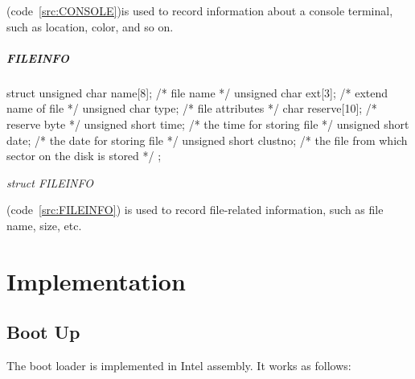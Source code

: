 \documentclass{swfcthesis}
\begin{document}
(code~\ref{src:CONSOLE})is used to record information about a console terminal, such as location,
color, and so on.




\paragraph{FILEINFO}

\begin{listing}[H]
  \begin{codeblock}
\begin{ccode}
struct
{ 
  unsigned char name[8];   /* file name */
  unsigned char ext[3];    /* extend name of file */
  unsigned char type;      /* file attributes */
  char reserve[10];        /* reserve byte */
  unsigned short time;     /* the time for storing file */
  unsigned short date;     /* the date for storing file */
  unsigned short  clustno; /* the file from which sector on the disk is stored */
};
\end{ccode}
  \end{codeblock}
  \caption{\emph{struct FILEINFO}}\label{src:FILEINFO}
\end{listing}

(code~\ref{src:FILEINFO}) is used to record file-related information, such as file name, size,
etc.
\fi %


    




\chapter{Implementation}

\section{Boot Up}
\label{sec:boot-up-1}

The boot loader is implemented in Intel assembly. It works as follows:
\end{document}
